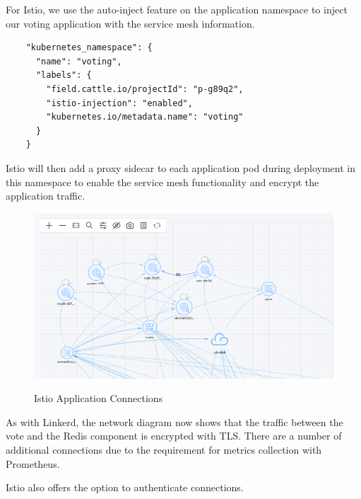For Istio, we use the auto-inject feature on the application namespace to inject our voting application with the service mesh information.

\begin{verbatim}
    "kubernetes_namespace": {
      "name": "voting",
      "labels": {
        "field.cattle.io/projectId": "p-g89q2",
        "istio-injection": "enabled",
        "kubernetes.io/metadata.name": "voting"
      }
    }
\end{verbatim}

Istio will then add a proxy sidecar to each application pod during deployment in this namespace to enable the service mesh functionality and encrypt the application traffic.

\begin{figure}[H]
\centering
\caption {Istio Application Connections}
\includegraphics[width=\linewidth]{images/istio-map.png}
\label{fig:IstioMap}
\end{figure}

As with Linkerd, the network diagram now shows that the traffic between the vote and the Redis component is encrypted with TLS. There are a number of additional connections due to the requirement for metrics collection with Prometheus.

Istio also offers the option to authenticate connections.
